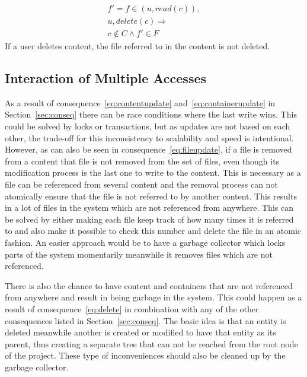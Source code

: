 \documentclass[a4paper,12pt]{article}
\newcommand{\Implies}{\Rightarrow}
\begin{document}
\begin{equation} \label{eq:delete}
    \begin{split}
        f' = f \in (u, read(c)),  \\
        u, delete(c) \Implies \\
        c \not \in C \land f' \in F
    \end{split}
\end{equation}
If a user deletes content, the file referred to in the content is not deleted.

\subsection{Interaction of Multiple Accesses} \label{sec:multiple_access}
As a result of consequence~\ref{eq:contentupdate} and~\ref{eq:containerupdate} in
Section~\ref{sec:conseq} there can be race conditions where the last write wins. This could be
solved by locks or transactions, but as updates are not based on each other, the trade-off for this
inconsistency to scalability and speed is intentional. However, as can also be seen in
consequence~\ref{eq:fileupdate}, if a file is removed from a content that file is not removed from
the set of files, even though its modification process is the last one to write to the content.
This is necessary as a file can be referenced from several content and the removal process can not
atomically ensure that the file is not referred to by another content. This results in a lot of
files in the system which are not referenced from anywhere. This can be solved by either making each
file keep track of how many times it is referred to and also make it possible to check this number
and delete the file in an atomic fashion. An easier approach would be to have a garbage collector
which locks parts of the system momentarily meanwhile it removes files which are not referenced. 

\par
There is also the chance to have content and containers that are not referenced from anywhere and
result in being garbage in the system. This could happen as a result of consequence~\ref{eq:delete}
in combination with any of the other consequences listed in Section~\ref{sec:conseq}. The basic idea
is that an entity is deleted meanwhile another is created or modified to have that entity as its
parent, thus creating a separate tree that can not be reached from the root node of the project.
These type of inconveniences should also be cleaned up by the garbage collector.
\end{document}
